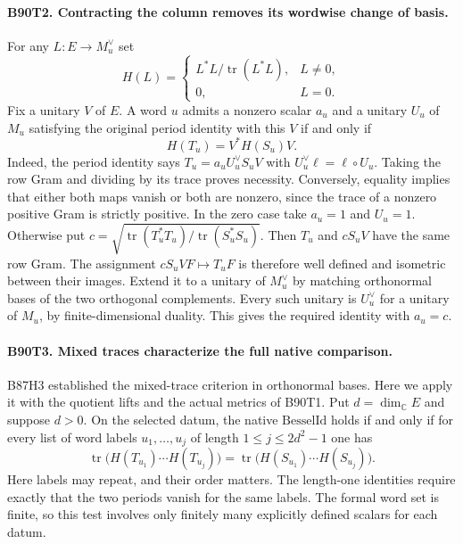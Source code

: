 \paragraph{B90T2. Contracting the column removes its wordwise change of basis.}
For any $L:E\to M_u^\vee$ set
\[
 H(L)=
 \begin{cases}
 L^*L/\operatorname{tr}(L^*L),&L\ne0,\\
 0,&L=0.
 \end{cases}
\]
Fix a unitary $V$ of $E$. A word $u$ admits a nonzero scalar $a_u$
and a unitary $U_u$ of $M_u$ satisfying the original period identity
with this $V$ if and only if
\[
                    H(T_u)=V^*H(S_u)V.                       \tag{B90.1}
\]
Indeed, the period identity says $T_u=a_u U_u^\vee S_uV$ with
$U_u^\vee\ell=\ell\circ U_u$. Taking the row Gram and dividing by its
trace proves necessity. Conversely, equality implies that either both
maps vanish or both are nonzero, since the trace of a nonzero positive
Gram is strictly positive. In the zero case take $a_u=1$ and
$U_u=1$. Otherwise put
$c=\sqrt{\operatorname{tr}(T_u^*T_u)/\operatorname{tr}(S_u^*S_u)}$.
Then $T_u$ and $cS_uV$ have the same row Gram. The assignment
$cS_uVF\mapsto T_uF$ is therefore well defined and isometric between
their images. Extend it to a unitary of $M_u^\vee$ by matching
orthonormal bases of the two orthogonal complements. Every such
unitary is $U_u^\vee$ for a unitary of $M_u$, by finite-dimensional
duality. This gives the required identity with $a_u=c$.

\paragraph{B90T3. Mixed traces characterize the full native comparison.}
B87H3 established the mixed-trace criterion in orthonormal bases.
Here we apply it with the quotient lifts and the actual metrics of
B90T1. Put $d=\dim_{\mathbb C} E$ and suppose $d>0$. On the selected datum,
the native $\mathrm{BesselId}$ holds if and only if for every list of
word labels $u_1,\ldots,u_j$ of length $1\le j\le 2d^2-1$ one has
\[
 \operatorname{tr}\bigl(H(T_{u_1})\cdots H(T_{u_j})\bigr)
 =
 \operatorname{tr}\bigl(H(S_{u_1})\cdots H(S_{u_j})\bigr).    \tag{B90.2}
\]
Here labels may repeat, and their order matters. The length-one
identities require exactly that the two periods vanish for the same
labels. The formal word set is finite, so this test involves only
finitely many explicitly defined scalars for each datum.

